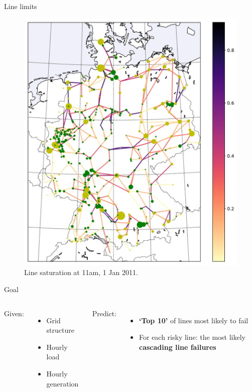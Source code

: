 \documentclass[10pt]{beamer}
\begin{document}
\begin{frame}{Line limits}
    \begin{figure}
    \includegraphics[height=.69\paperheight]{img/nominallineflow.pdf}
    \caption{Line saturation at 11am, 1 Jan 2011.}
    \end{figure}
\end{frame}

\begin{frame}{Goal}
    \begin{columns}[T,onlytextwidth]
    Given:
    \begin{itemize}
        \item Grid structure
        \item Hourly load
        \item Hourly generation
    \end{itemize}
    
    Predict:
    \begin{itemize}
        \item \textbf{`Top 10'} of lines most likely to fail
        \item For each risky line: the most likely \textbf{cascading line failures}
    \end{itemize}
    \end{columns}
\end{frame}
\end{document}
